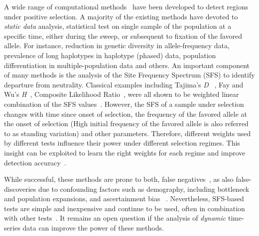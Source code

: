 \documentclass[11pt]{article}
\begin{document}
A wide range of computational methods~\cite{vitti2013detecting} have
been developed to detect regions under positive selection. A majority
of the existing methods have devoted to \emph{static data} analysis,
statistical test on single sample of the population at a specific
time, either during the sweep, or subsequent to fixation of the
favored allele. For instance, reduction in genetic
diversity\cite{tajima1989statistical,fay2000hitchhiking,ronen2013learning}
in allele-frequency data, prevalence of long haplotypes
\cite{sabeti2006positive,vitti2013detecting} in haplotype (phased)
data, population differentiation
\cite{holsinger2009genetics,burke2010genome} in multiple-population
data and others. An important component of many methods is the
analysis of the Site Frequency Spectrum (SFS) to identify departure
from neutrality. Classical examples including Tajima's \emph{D}
~\cite{tajima1989statistical}, Fay and Wu's
\emph{H}~\cite{fay2000hitchhiking}, Composite Likelihood
Ratio~\cite{nielsen2005genomic}, were all shown to be weighted linear
combination of the SFS values~\cite{achaz2009frequency}. However, the
SFS of a sample under selection changes with time since onset of
selection, the frequency of the favored allele at the onset of
selection (High initial frequency of the favored allele is also
referred to as standing variation) and other parameters. Therefore,
different weights used by different tests influence their power under
different selection regimes. This insight can be exploited to learn
the right weights for each regime and improve detection
accuracy~\cite{ronen2013learning}.

While successful, these methods are prone to both, false
negatives~\cite{messer2013population}, as also false-discoveries due
to confounding factors such as demography, including bottleneck and
population expansions, and ascertainment bias ~\cite{ptak2002evidence,
  ramos2002statistical,akey2009constructing,
  nielsen2003correcting,messer2013population}. Nevertheless, SFS-based
tests are simple and inexpensive and continue to be used, often in
combination with other
tests~\cite{akey2009constructing,vitti2013detecting}. It remains an
open question if the analysis of \emph{dynamic} time-series data can
improve the power of these methods.
\end{document}

